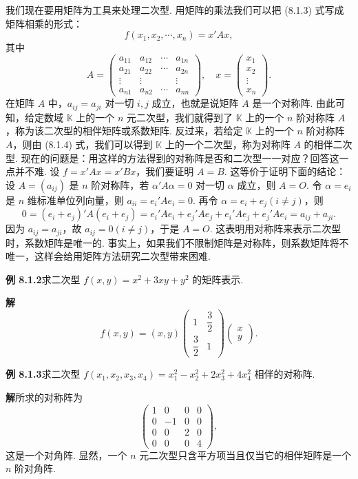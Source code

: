 \documentclass[UTF8,12pt,a4paper,fontset=fandol]{ctexart}
\begin{document}
我们现在要用矩阵为工具来处理二次型. 用矩阵的乘法我们可以把 (8.1.3) 式写成矩阵相乘的形式：
\begin{equation}
f(x_1,x_2,\cdots,x_n)=x' Ax,
\tag{8.1.4}
\end{equation}
其中
\[
A=\left(\begin{array}{cccc}
a_{11}&a_{12}&\cdots&a_{1n}\\
a_{21}&a_{22}&\cdots&a_{2n}\\
\vdots&\vdots&&\vdots\\
a_{n1}&a_{n2}&\cdots&a_{nn}
\end{array}\right),\quad
x=\left(\begin{array}{c}
x_1\\
x_2\\
\vdots\\
x_n
\end{array}\right).
\]
在矩阵 $A$ 中，$a_{ij}=a_{ji}$ 对一切 $i,j$ 成立，也就是说矩阵 $A$ 是一个对称阵. 由此可知，给定数域 $\mathbb K$ 上的一个 $n$ 元二次型，我们就得到了 $\mathbb K$ 上的一个 $n$ 阶对称阵 $A$，称为该二次型的相伴矩阵或系数矩阵. 反过来，若给定 $\mathbb K$ 上的一个 $n$ 阶对称阵 $A$，则由 (8.1.4) 式，我们可以得到 $\mathbb K$ 上的一个二次型，称为对称阵 $A$ 的相伴二次型. 现在的问题是：用这样的方法得到的对称阵是否和二次型一一对应？回答这一点并不难. 设 $f=x'Ax=x'Bx$，我们要证明 $A=B$. 这等价于证明下面的结论：设 $A=(a_{ij})$ 是 $n$ 阶对称阵，若 $\alpha'A\alpha=0$ 对一切 $\alpha$ 成立，则 $A=O$. 令 $\alpha=e_i$ 是 $n$ 维标准单位列向量，则 $a_{ii}=e_i'Ae_i=0$. 再令 $\alpha=e_i+e_j(i\neq j)$，则
\[
0=(e_i+e_j)'A(e_i+e_j)=e_i'Ae_i+e_j'Ae_j+e_i'Ae_j+e_j'Ae_i=a_{ij}+a_{ji}.
\]
因为 $a_{ij}=a_{ji}$，故 $a_{ij}=0(i\neq j)$，于是 $A=O$. 这表明用对称阵来表示二次型时，系数矩阵是唯一的. 事实上，如果我们不限制矩阵是对称阵，则系数矩阵将不唯一，这样会给用矩阵方法研究二次型带来困难.

\noindent\textbf{例 8.1.2}\quad 求二次型 $f(x,y)=x^2+3xy+y^2$ 的矩阵表示.

\noindent\textbf{解}\quad
\[
f(x,y)=(x,y)\left(\begin{array}{cc}
1&\dfrac32\\
\dfrac32&1
\end{array}\right)
\left(\begin{array}{c}
x\\
y
\end{array}\right).
\]

\noindent\textbf{例 8.1.3}\quad 求二次型 $f(x_1,x_2,x_3,x_4)=x_1^2-x_2^2+2x_3^2+4x_4^2$ 相伴的对称阵.

\noindent\textbf{解}\quad 所求的对称阵为
\[
\left(\begin{array}{cccc}
1&0&0&0\\
0&-1&0&0\\
0&0&2&0\\
0&0&0&4
\end{array}\right),
\]
这是一个对角阵. 显然，一个 $n$ 元二次型只含平方项当且仅当它的相伴矩阵是一个 $n$ 阶对角阵.
\end{document}
